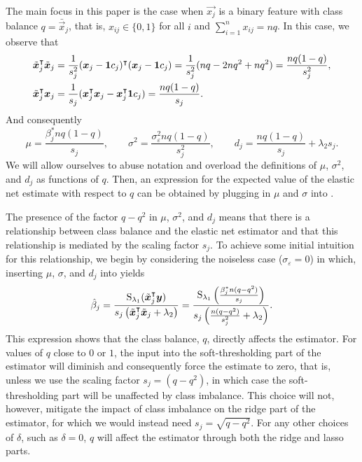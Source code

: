 The main focus in this paper is the case when \(\vec{x_j}\) is a binary feature with class balance \(q = \bar{\vec{x}}_j\), that is, \(x_{ij} \in \{0, 1\}\) for all \(i\) and \(\sum_{i=1}^n x_{ij} = nq\).
In this case, we observe that
\[
  \begin{aligned}
    \tilde{\boldsymbol{x}}_j^\intercal \tilde{\boldsymbol{x}}_j & = \frac{1}{s_j^2}(\boldsymbol{x}_j - \boldsymbol{1} c_j)^\intercal (\boldsymbol{x}_j - \boldsymbol{1} c_j) = \frac{1}{s^2_j}(nq - 2nq^2 + nq^2) = \frac{nq(1-q)}{s^2_j}, \\
    \tilde{\boldsymbol{x}}_j^\intercal \boldsymbol{x}_j         & = \frac{1}{s_j}(\boldsymbol{x}_j^\intercal \boldsymbol{x}_j - \boldsymbol{x}_j^\intercal \boldsymbol{1} c_j) = \frac{nq(1 - q)}{s_j}.
  \end{aligned}
\]
And consequently
\[
  \mu = \frac{\beta^*_j nq(1 - q)}{s_j}, \qquad \sigma^2 = \frac{\sigma_\varepsilon^2nq(1 - q)}{s^2_j}, \qquad d_j = \frac{nq(1 -q)}{s_j}  + \lambda_2 s_j.
\]
We will allow ourselves to abuse notation and overload the definitions of \(\mu\), \(\sigma^2\), and \(d_j\) as functions of \(q\). Then, an expression for the expected value of the elastic net estimate with respect to \(q\) can be obtained by plugging in \(\mu\) and \(\sigma\) into .

The presence of the factor \(q - q^2\) in \(\mu\), \(\sigma^2\), and \(d_j\) means that there is a relationship between class balance and the elastic net estimator and that this relationship is mediated by the scaling factor \(s_j\). To achieve some initial intuition for this relationship, we begin by considering the noiseless case (\(\sigma_\varepsilon = 0\)) in which, inserting  \(\mu\), \(\sigma\), and \(d_j\) into  yields
\begin{equation}
  \label{eq:noiseless-estimator}
  \hat{\beta}_j = \frac{\operatorname{S}_{\lambda_1}(\tilde{\boldsymbol{x}}_j^\intercal \boldsymbol{y})}{s_j\left(\tilde{\boldsymbol{x}}_j^\intercal \tilde{\boldsymbol{x}}_j + \lambda_2\right)}
  =
  \frac{\operatorname{S}_{\lambda_1}\left(\frac{\beta_j^* n (q - q^2)}{s_j}\right)}{s_j\left(\frac{n(q - q^2)}{s_j^2} + \lambda_2\right)}.
\end{equation}
This expression shows that the class balance, \(q\), directly affects the estimator. For values of \(q\) close to \(0\) or \(1\), the input into the soft-thresholding part of the estimator will diminish and consequently force the estimate to zero, that is, unless we use the scaling factor \(s_j = (q - q^2)\), in which case the soft-thresholding part will be unaffected by class imbalance. This choice will not, however, mitigate the impact of class imbalance on the ridge part of the estimator, for which we would instead need \(s_j = \sqrt{q - q^2}\). For any other choices of \(\delta\), such as \(\delta = 0\), \(q\) will affect the estimator through both the ridge and lasso parts.


